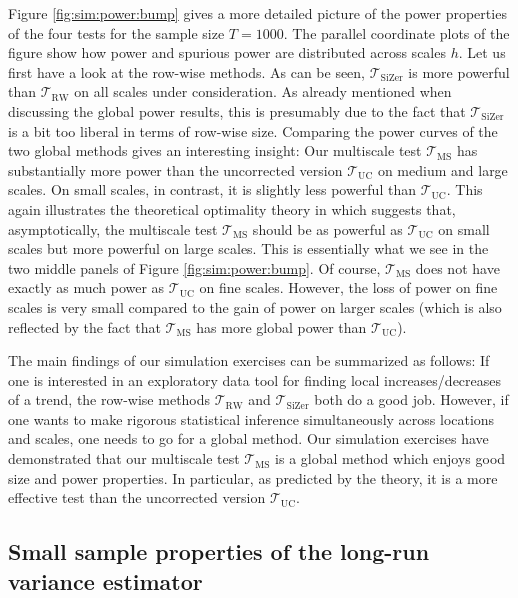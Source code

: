 Figure \ref{fig:sim:power:bump} gives a more detailed picture of the power properties of the four tests for the sample size $T=1000$. The parallel coordinate plots of the figure show how power and spurious power are distributed across scales $h$. Let us first have a look at the row-wise methods. As can be seen, $\mathcal{T}_{\text{SiZer}}$ is more powerful than $\mathcal{T}_{\text{RW}}$ on all scales under consideration. As already mentioned when discussing the global power results, this is presumably due to the fact that $\mathcal{T}_{\text{SiZer}}$ is a bit too liberal in terms of row-wise size. Comparing the power curves of the two global methods gives an interesting insight: Our multiscale test $\mathcal{T}_{\text{MS}}$ has substantially more power than the uncorrected version $\mathcal{T}_{\text{UC}}$ on medium and large scales. On small scales, in contrast, it is slightly less powerful than $\mathcal{T}_{\text{UC}}$. This again illustrates the theoretical optimality theory in \cite{DuembgenSpokoiny2001} which suggests that, asymptotically, the multiscale test $\mathcal{T}_{\text{MS}}$ should be as powerful as $\mathcal{T}_{\text{UC}}$ on small scales but more powerful on large scales. This is essentially what we see in the two middle panels of Figure \ref{fig:sim:power:bump}. Of course, $\mathcal{T}_{\text{MS}}$ does not have exactly as much power as $\mathcal{T}_{\text{UC}}$ on fine scales. However, the loss of power on fine scales is very small compared to the gain of power on larger scales (which is also reflected by the fact that $\mathcal{T}_{\text{MS}}$ has more global power than $\mathcal{T}_{\text{UC}}$). 


The main findings of our simulation exercises can be summarized as follows: If one is interested in an exploratory data tool for finding local increases/decreases of a trend, the row-wise methods $\mathcal{T}_{\text{RW}}$ and $\mathcal{T}_{\text{SiZer}}$ both do a good job. However, if one wants to make rigorous statistical inference simultaneously across locations and scales,
one needs to go for a global method. Our simulation exercises have demonstrated that our multiscale test $\mathcal{T}_{\text{MS}}$ is a global method which enjoys good size and power properties. In particular, as predicted by the theory, it is a more effective test than the uncorrected version $\mathcal{T}_{\text{UC}}$. 


\subsection{Small sample properties of the long-run variance estimator}\label{subsec-sim-lrv}


